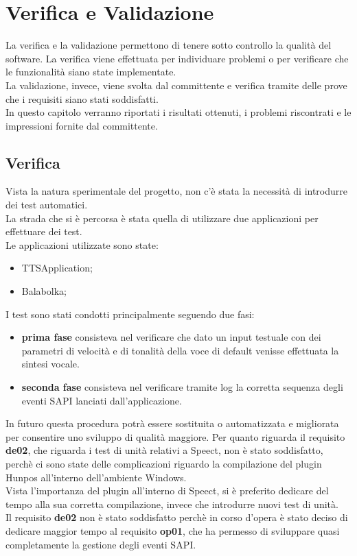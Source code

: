 \chapter{Verifica e Validazione}
La verifica e la validazione permettono di tenere sotto controllo la qualità del software.
La verifica viene effettuata per individuare problemi o per verificare che le funzionalità siano state implementate.\\
La validazione, invece, viene svolta dal committente e verifica tramite delle prove che i requisiti siano stati soddisfatti.\\
In questo capitolo verranno riportati i risultati ottenuti, i problemi riscontrati e le impressioni fornite dal committente. 
\thispagestyle{empty}

\newpage
\section{Verifica}
Vista la natura sperimentale del progetto, non c'è stata la necessità di introdurre dei test automatici.\\
La strada che si è percorsa è stata quella di utilizzare due applicazioni per effettuare dei test.\\
Le applicazioni utilizzate sono state:
\begin{itemize}
	\item TTSApplication;
	\item Balabolka;
\end{itemize}
I test sono stati condotti principalmente seguendo due fasi:
\begin{itemize}
	\item \textbf{prima fase} consisteva nel verificare che dato un input testuale con dei parametri di velocità e di tonalità della voce di default venisse effettuata la sintesi vocale.
	\item \textbf{seconda fase} consisteva nel verificare tramite log la corretta sequenza degli eventi SAPI lanciati dall'applicazione.
\end{itemize}
In futuro questa procedura potrà essere sostituita o automatizzata e migliorata per consentire uno sviluppo di qualità maggiore.
Per quanto riguarda il requisito \textbf{de02}, che riguarda i test di unità relativi a Speect, non è stato soddisfatto, perchè ci sono state delle complicazioni riguardo la compilazione del plugin Hunpos all'interno dell'ambiente Windows.\\
Vista l'importanza del plugin all'interno di Speect, si è preferito dedicare del tempo alla sua corretta compilazione, invece che introdurre nuovi test di unità.\\
Il requisito \textbf{de02} non è stato soddisfatto perchè in corso d'opera è stato deciso di dedicare maggior tempo al requisito \textbf{op01}, che ha permesso di sviluppare quasi completamente la gestione degli eventi SAPI.
